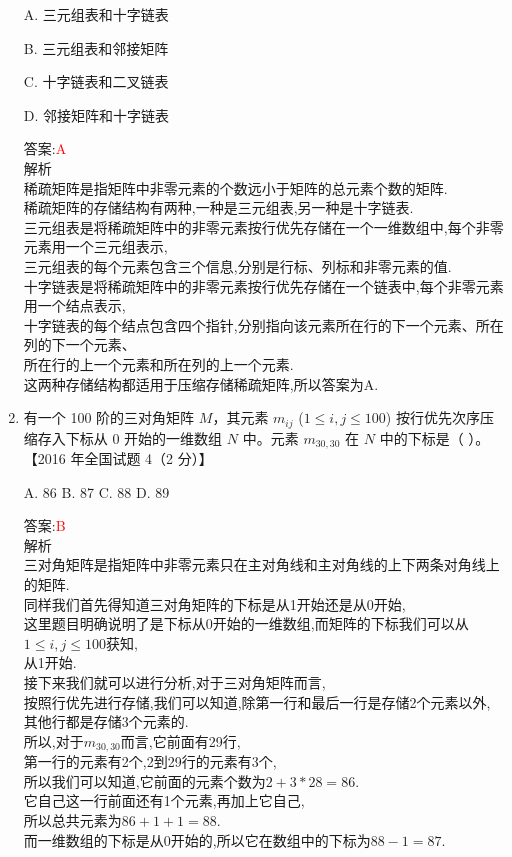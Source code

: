 \documentclass[lang=cn,newtx,10pt,scheme=chinese]{../elegantbook}
\begin{document}
\begin{enumerate}
    A. 三元组表和十字链表  

    B. 三元组表和邻接矩阵  

    C. 十字链表和二叉链表 

    D. 邻接矩阵和十字链表  

    答案:\textcolor{red}{A}\\
    解析\\
    稀疏矩阵是指矩阵中非零元素的个数远小于矩阵的总元素个数的矩阵.\\
    稀疏矩阵的存储结构有两种,一种是三元组表,另一种是十字链表.\\
    三元组表是将稀疏矩阵中的非零元素按行优先存储在一个一维数组中,每个非零元素用一个三元组表示,\\
    三元组表的每个元素包含三个信息,分别是行标、列标和非零元素的值.\\
    十字链表是将稀疏矩阵中的非零元素按行优先存储在一个链表中,每个非零元素用一个结点表示,\\
    十字链表的每个结点包含四个指针,分别指向该元素所在行的下一个元素、所在列的下一个元素、\\
    所在行的上一个元素和所在列的上一个元素.\\
    这两种存储结构都适用于压缩存储稀疏矩阵,所以答案为A.\\

    \item 有一个 100 阶的三对角矩阵 $M$，其元素 $m_{ij}$ ($1 \leq i, j \leq 100$) 按行优先次序压缩存入下标从 0 开始的一维数组 $N$ 中。元素 $m_{30,30}$ 在 $N$ 中的下标是（ ）。  
    【2016 年全国试题 4（2 分）】  

    A. 86 \quad B. 87 \quad C. 88 \quad D. 89  

    答案:\textcolor{red}{B}\\
    解析\\
    三对角矩阵是指矩阵中非零元素只在主对角线和主对角线的上下两条对角线上的矩阵.\\
    同样我们首先得知道三对角矩阵的下标是从1开始还是从0开始,\\
    这里题目明确说明了是下标从0开始的一维数组,而矩阵的下标我们可以从$1 \leq i, j \leq 100$获知,\\
    从1开始.\\
    接下来我们就可以进行分析,对于三对角矩阵而言,\\
    按照行优先进行存储,我们可以知道,除第一行和最后一行是存储2个元素以外,\\
    其他行都是存储3个元素的.\\
    所以,对于$m_{30,30}$而言,它前面有29行,\\
    第一行的元素有2个,2到29行的元素有3个,\\
    所以我们可以知道,它前面的元素个数为$2+3*28=86$.\\
    它自己这一行前面还有1个元素,再加上它自己,\\
    所以总共元素为$86+1+1=88$.\\
    而一维数组的下标是从0开始的,所以它在数组中的下标为$88-1=87$.\\


\end{enumerate}
\end{document}
